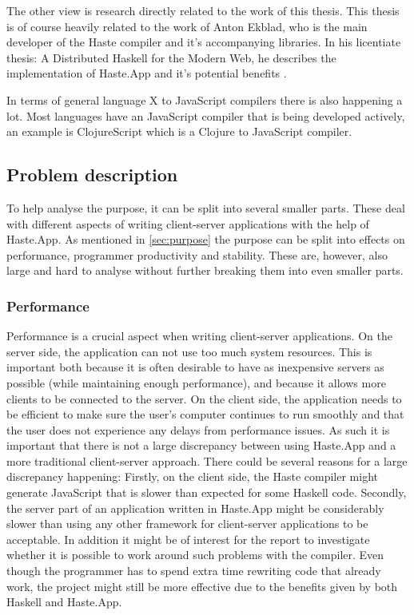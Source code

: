 \documentclass[a4paper]{article}
\begin{document}
The other view is research directly related to the work of this thesis. This thesis is of course heavily related to the work of Anton Ekblad, who is the main developer of the Haste compiler and it's accompanying libraries. In his licentiate thesis: A Distributed Haskell for the Modern Web, he describes the implementation of Haste.App and it's potential benefits \cite{a-distributed-haskell-for-the-modern-web}.

In terms of general language X to JavaScript compilers there is also happening a lot. Most languages have an JavaScript compiler that is being developed actively, an example is ClojureScript which is a Clojure to JavaScript compiler.

\subsection{Problem description}
\label{sec:problem}
To help analyse the purpose, it can be split into several smaller parts. These deal with different aspects of writing client-server applications with the help of Haste.App. As mentioned in \cref{sec:purpose} the purpose can be split into effects on performance, programmer productivity and stability. These are, however, also large and hard to analyse without further breaking them into even smaller parts.


\subsubsection{Performance}
Performance is a crucial aspect when writing client-server applications. On the server side, the application can not use too much system resources. This is important both because it is often desirable to have as inexpensive servers as possible (while maintaining enough performance), and because it allows more clients to be connected to the server. On the client side, the application needs to be efficient to make sure the user's computer continues to run smoothly and that the user does not experience any delays from performance issues. As such it is important that there is not a large discrepancy between using Haste.App and a more traditional client-server approach. There could be several reasons for a large discrepancy happening: Firstly, on the client side, the Haste compiler might generate JavaScript that is slower than expected for some Haskell code. Secondly, the server part of an application written in Haste.App might be considerably slower than using any other framework for client-server applications to be acceptable. In addition it might be of interest for the report to investigate whether it is possible to work around such problems with the compiler. Even though the programmer has to spend extra time rewriting code that already work, the project might still be more effective due to the benefits given by both Haskell and Haste.App.
\end{document}
